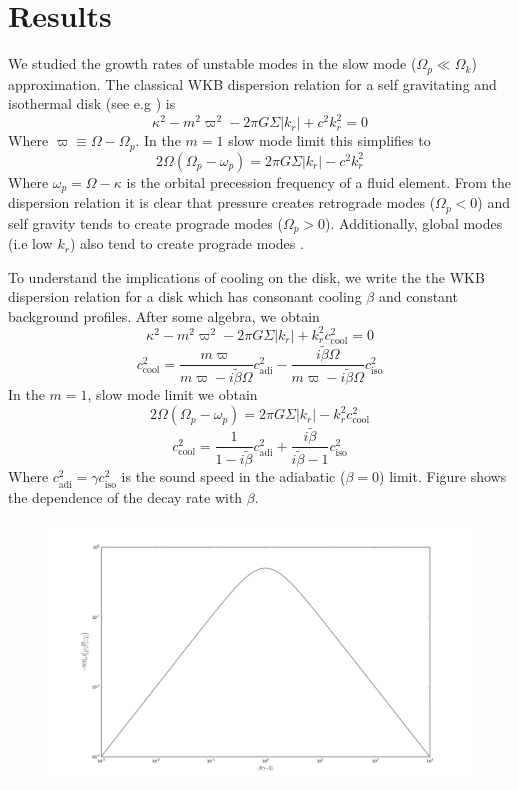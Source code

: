 \documentclass[apj]{emulateapj}
\begin{document}
\section{Results}
We studied the growth rates of unstable modes in the slow mode ($\Omega_p \ll \Omega_k$) approximation. The classical WKB dispersion relation for a self gravitating and isothermal disk (see e.g \citet{bt2}) is
\begin{equation}
 \kappa^2  - m^2 \varpi^2 - 2 \pi G \Sigma |k_r| + c^2 k_r^2  = 0
\end{equation}
Where $\varpi \equiv \Omega - \Omega_p$. In the $m=1$ slow mode limit this simplifies to \citep{papa02}
\begin{equation}
2 \Omega ( \Omega_p - \omega_p) =  2 \pi G \Sigma |k_r| - c^2 k_r^2 
\end{equation}
Where $\omega_p = \Omega - \kappa$ is the orbital precession frequency of a fluid element. From the dispersion relation it is clear that pressure creates retrograde modes ($\Omega_p < 0$) and self gravity tends to create prograde modes ($\Omega_p > 0$). Additionally, global modes (i.e low $k_r$) also tend to create prograde modes \citep{papa02}. 

To understand the implications of cooling on the disk, we write the the WKB dispersion relation for a disk which has consonant cooling $\beta$ and constant background profiles. After some algebra, we obtain
\begin{equation}
 \kappa^2  - m^2 \varpi^2 - 2 \pi G \Sigma |k_r| + k_r^2 c_\text{cool}^2= 0
\end{equation}
\begin{equation}
c_\text{cool}^2 =  \frac{ m \varpi}{ m \varpi - i \tilde{\beta} \Omega} c_\text{adi}^2 - \frac{ i \tilde{\beta} \Omega }{ m \varpi - i \tilde{\beta} \Omega} c_\text{iso}^2
\end{equation}
In the $m=1$, slow mode limit we obtain
\begin{equation}
2 \Omega ( \Omega_p - \omega_p) = 2 \pi G \Sigma |k_r| - k_r^2 c_\text{cool}^2  
\end{equation}
\begin{equation}
c_\text{cool}^2 = \frac{1}{1 - i \tilde{\beta}} c_\text{adi}^2 + \frac{ i \tilde{\beta}}{i \tilde{\beta} -1 } c_\text{iso}^2
\end{equation}
Where $c_\text{adi}^2 = \gamma c_\text{iso}^2$ is the sound speed in the adiabatic ($\beta = 0$) limit. Figure  shows the dependence of the decay rate with $\beta$. 

\begin{figure}[h]
\includegraphics[width=.5\textwidth]{growth_wkb}
\caption{}
\end{figure}
\end{document}
